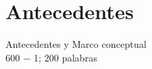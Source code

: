 \section{Antecedentes}
\label{Antecedentes}
Antecedentes y Marco conceptual\\
600 − 1; 200 palabras\\
\lipsum